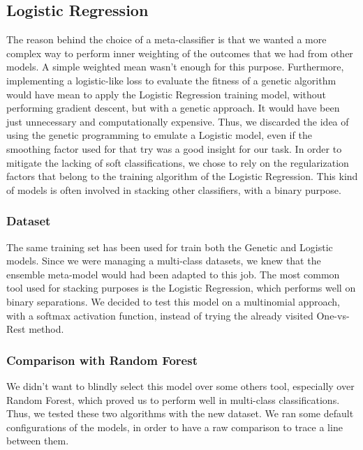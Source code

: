 \subsection{Logistic Regression}
The reason behind the choice of a meta-classifier is that we wanted a more complex way to perform inner weighting of the outcomes that we had from other models.
A simple weighted mean wasn't enough for this purpose. Furthermore, implementing a logistic-like loss to evaluate the fitness of a genetic algorithm would have mean to apply the Logistic Regression training model, without performing gradient descent, but with a genetic approach. It would have been just unnecessary and computationally expensive.
Thus, we discarded the idea of using the genetic programming to emulate a Logistic model, even if the smoothing factor used for that try was a good insight for our task.
In order to mitigate the lacking of soft classifications, we chose to rely on the regularization factors that belong to the training algorithm of the Logistic Regression.
This kind of models is often involved in stacking other classifiers, with a binary purpose.

\subsubsection{Dataset}
The same training set has been used for train both the Genetic and Logistic models.
Since we were managing a multi-class datasets, we knew that the ensemble meta-model would had been adapted to this job. The most common tool used for stacking purposes is the Logistic Regression, which performs well on binary separations. We decided to test this model on a multinomial approach, with a softmax activation function, instead of trying the already visited One-vs-Rest method.

\subsubsection{Comparison with Random Forest}
We didn't want to blindly select this model over some others tool, especially over Random Forest, which proved us to perform well in multi-class classifications.
Thus, we tested these two algorithms with the new dataset.
We ran some default configurations of the models, in order to have a raw comparison to trace a line between them.


